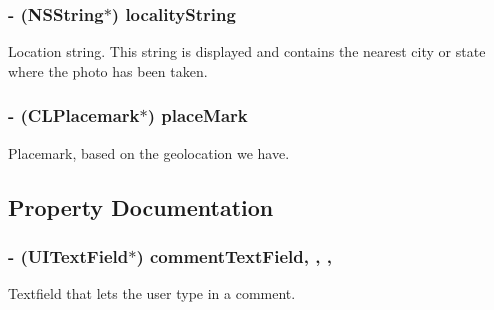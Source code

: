 \subsubsection[{locality\+String}]{\setlength{\rightskip}{0pt plus 5cm}-\/ (N\+S\+String$\ast$) locality\+String\hspace{0.3cm}{\ttfamily [protected]}}\label{interface_e_s_edit_photo_view_controller_af0590524a962c7e5e2f3608accbdf1c1}
Location string. This string is displayed and contains the nearest city or state where the photo has been taken. \hypertarget{interface_e_s_edit_photo_view_controller_ace5372d346d0c41016fa45573d6088f9}{}
\subsubsection[{place\+Mark}]{\setlength{\rightskip}{0pt plus 5cm}-\/ (C\+L\+Placemark$\ast$) place\+Mark\hspace{0.3cm}{\ttfamily [protected]}}\label{interface_e_s_edit_photo_view_controller_ace5372d346d0c41016fa45573d6088f9}
Placemark, based on the geolocation we have. 

\subsection{Property Documentation}
\hypertarget{interface_e_s_edit_photo_view_controller_ac96f0e939d3d229c2493bf346f55a40b}{}
\subsubsection[{comment\+Text\+Field}]{\setlength{\rightskip}{0pt plus 5cm}-\/ (U\+I\+Text\+Field$\ast$) comment\+Text\+Field\hspace{0.3cm}{\ttfamily [read]}, {\ttfamily [write]}, {\ttfamily [nonatomic]}, {\ttfamily [strong]}}\label{interface_e_s_edit_photo_view_controller_ac96f0e939d3d229c2493bf346f55a40b}
Textfield that lets the user type in a comment. \hypertarget{interface_e_s_edit_photo_view_controller_ae5a6bcf0bf121023ec8d9b6dd942dfaa}{}
